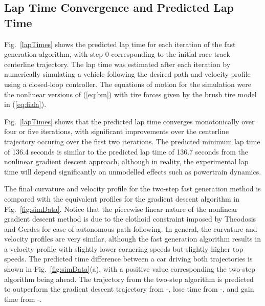 \documentclass[twocolumn,10pt]{asme2ej}
\newcommand*\circled[1]{\tikz[baseline=(char.base)]{
            \node[shape=circle,draw,inner sep=2pt] (char) {#1};}}
\begin{document}
 
\subsection{Lap Time Convergence and Predicted Lap Time}
Fig.~\ref{lapTimes} shows the predicted lap time for each iteration of the fast generation algorithm, with step 0 corresponding
to the initial race track centerline trajectory. The lap time was estimated after each iteration by numerically simulating a vehicle 
 following the desired path and velocity profile using a closed-loop controller. The equations of motion for the simulation
were the nonlinear versions of (\ref{eq:bm}) with tire forces given by
the brush tire model in (\ref{eq:fiala}). 

Fig.~\ref{lapTimes} shows that the predicted lap time converges monotonically over four or five iterations, with significant 
improvements over the centerline trajectory occuring over the first two iterations. The predicted minimum lap time of 136.4 seconds
is similar to the predicted lap time of 136.7 seconds from the nonlinear gradient descent approach, 
although in reality, the experimental lap time will depend significantly on unmodelled effects such 
as powertrain dynamics.  

The final curvature and velocity profile  for the two-step fast generation method is compared with the equivalent profiles for the gradient
descent algorithm in Fig.~\ref{fig:simData}. Notice that the piecewise linear nature of the 
nonlinear gradient descent method is due to the clothoid constraint imposed by Theodosis and Gerdes \cite{theodosis} for ease of autonomous path following.
In general, the curvature and velocity profiles are very similar, although the fast generation algorithm results in a velocity profile
with slightly lower cornering speeds but slightly higher top speeds. The predicted time difference between a car driving both trajectories 
is shown in Fig.~\ref{fig:simData}(a), with a positive
value corresponding the two-step algorithm being ahead. The trajectory from the two-step algorithm is predicted to outperform the 
gradient descent trajectory from \circled{a}-\circled{c}, lose time from \circled{c}-\circled{e}, and gain time from \circled{e}-\circled{h}.
\end{document}
